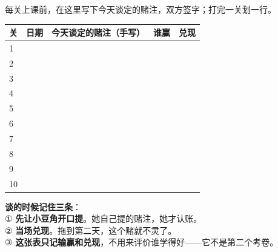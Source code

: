 
\begin{unitinfo}
每关上课前，在这里写下今天谈定的赌注，双方签字；打完一关划一行。
\end{unitinfo}

\begin{center}
\small
\renewcommand{\arraystretch}{1.85}
\begin{tabularx}{\linewidth}{@{}p{0.8cm}p{2.0cm}Xp{2.2cm}p{1.5cm}@{}}
\hline
\textbf{关} & \textbf{日期} & \textbf{今天谈定的赌注（手写）} & \textbf{谁赢} & \textbf{兑现} \\
\hline
1 & & & & \\ \hline
2 & & & & \\ \hline
3 & & & & \\ \hline
4 & & & & \\ \hline
5 & & & & \\ \hline
6 & & & & \\ \hline
7 & & & & \\ \hline
8 & & & & \\ \hline
9 & & & & \\ \hline
10 & & & & \\ \hline
\end{tabularx}
\end{center}

\vspace{0.3cm}

\begin{tipbox}
\textbf{谈的时候记住三条}：\\
① \textbf{先让小豆角开口提}。她自己提的赌注，她才认账。\\
② \textbf{当场兑现}。拖到第二天，这个赌就不灵了。\\
③ \textbf{这张表只记输赢和兑现}，不用来评价谁学得好——它不是第二个考卷。
\end{tipbox}

\vspace{0.2cm}

